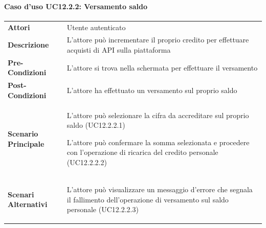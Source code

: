 \paragraph{Caso d'uso UC12.2.2: Versamento saldo}
\label{UC12_2_2}
\begin{minipage}{\linewidth}
	\begin{tabular}{ l | p{11cm}}
		\hline
		\rowcolor{Gray}
		\multicolumn{2}{c}{UC12.2.2 - Versamento saldo} \\
		\hline
		\textbf{Attori} & Utente autenticato \\
		\textbf{Descrizione} & L'attore può incrementare il proprio credito per effettuare acquisti di API sulla piattaforma \\
		\textbf{Pre-Condizioni} & L'attore si trova nella schermata per effettuare il versamento\\
		\textbf{Post-Condizioni} & L'attore ha effettuato un versamento sul proprio saldo \\
		\textbf{Scenario Principale} & 
		\begin{enumerate*}[label=(\arabic*.),itemjoin={\newline}]
			\item L'attore può selezionare la cifra da accreditare sul proprio saldo (UC12.2.2.1)
			\item L'attore può confermare la somma selezionata e procedere con l'operazione di ricarica del credito personale (UC12.2.2.2)
		\end{enumerate*}\\
		\textbf{Scenari Alternativi} & \begin{enumerate*}[label=(\arabic*.),itemjoin={\newline}]
			\item L'attore può visualizzare un messaggio d'errore che segnala il fallimento dell'operazione di versamento sul saldo personale (UC12.2.2.3)
		\end{enumerate*}\\
	\end{tabular}
\end{minipage}


